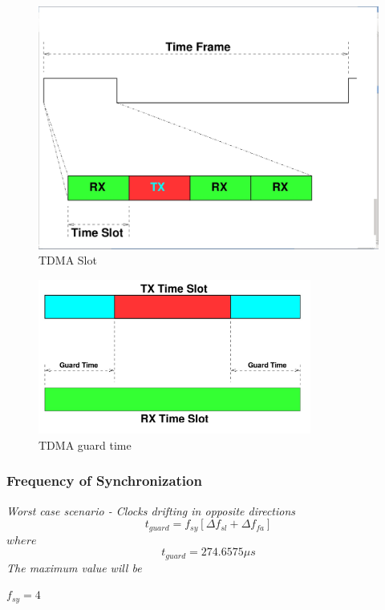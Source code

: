 \documentclass[t]{beamer}
\begin{document}
\begin{frame}
\begin{figure}
 \includegraphics[width=0.8 \textwidth]{tdma_slot}
 \caption{TDMA Slot}
\end{figure}
\end{frame}


\begin{frame}
\begin{figure}
 \includegraphics[width=0.8\textwidth]{a_slot}
 \caption{TDMA guard time}
\end{figure}
\end{frame}

\begin{frame}
    \frametitle{Frequency of Synchronization}
\textit{Worst case scenario - Clocks drifting in opposite
directions}
\begin{equation}
t_{guard} = f_{sy}[\Delta f_{sl} + \Delta f_{fa}]
\end{equation}
$where$
\begin{equation}
 t_{guard} = 274.6575 \mu s
\end{equation}
\newline
\textit{The maximum value will be}
\begin{center}
$f_{sy}= 4 $\end{center}
\end{frame}
\end{document}
